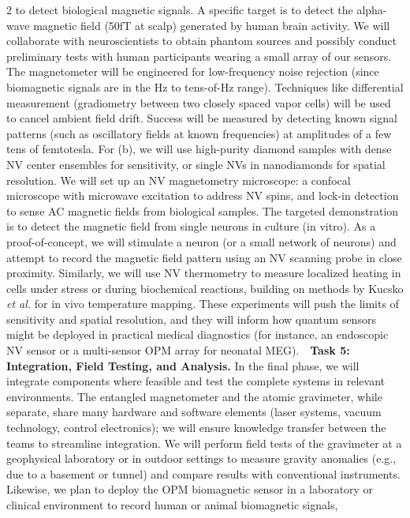 \documentclass[12pt]{article}
\begin{document}
2 to detect biological magnetic signals. A specific target is to
detect the alpha-wave magnetic field (50fT at scalp) generated by
human brain activity. We will collaborate with neuroscientists to
obtain phantom sources and possibly conduct preliminary tests with
human participants wearing a small array of our sensors. The
magnetometer will be engineered for low-frequency noise rejection
(since biomagnetic signals are in the Hz to tens-of-Hz
range). Techniques like differential measurement (gradiometry between
two closely spaced vapor cells) will be used to cancel ambient field
drift. Success will be measured by detecting known signal patterns
(such as oscillatory fields at known frequencies) at amplitudes of a
few tens of femtotesla. For (b), we will use high-purity diamond
samples with dense NV center ensembles for sensitivity, or single NVs
in nanodiamonds for spatial resolution. We will set up an NV
magnetometry microscope: a confocal microscope with microwave
excitation to address NV spins, and lock-in detection to sense AC
magnetic fields from biological samples. The targeted demonstration is
to detect the magnetic field from single neurons in culture (in
vitro). As a proof-of-concept, we will stimulate a neuron (or a small
network of neurons) and attempt to record the magnetic field pattern
using an NV scanning probe in close
proximity\cite{Aslam2023}. Similarly, we will use NV thermometry to
measure localized heating in cells under stress or during biochemical
reactions, building on methods by Kucsko \textit{et al.} for in vivo
temperature mapping. These experiments will push the limits of
sensitivity and spatial resolution, and they will inform how quantum
sensors might be deployed in practical medical diagnostics (for
instance, an endoscopic NV sensor or a multi-sensor OPM array for
neonatal MEG).    \textbf{Task 5: Integration, Field Testing, and
  Analysis.} In the final phase, we will integrate components where
feasible and test the complete systems in relevant environments. The
entangled magnetometer and the atomic gravimeter, while separate,
share many hardware and software elements (laser systems, vacuum
technology, control electronics); we will ensure knowledge transfer
between the teams to streamline integration. We will perform field
tests of the gravimeter at a geophysical laboratory or in outdoor
settings to measure gravity anomalies (e.g., due to a basement or
tunnel) and compare results with conventional instruments. Likewise,
we plan to deploy the OPM biomagnetic sensor in a laboratory or
clinical environment to record human or animal biomagnetic signals,
\end{document}
